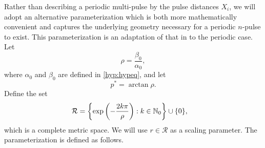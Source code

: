 \documentclass[10pt,reqno]{amsart}
\theoremstyle{plain}
\theoremstyle{definition}
\theoremstyle{remark}
\numberwithin{theorem}{section}
\numberwithin{equation}{section}
\begin{document}
Rather than describing a periodic multi-pulse by the pulse distances $X_i$, we will adopt an alternative parameterization which is both more mathematically convenient and captures the underlying geometry necessary for a periodic $n$-pulse to exist. This parameterization is an adaptation of that in \cite{SandstedeStrut,Sandstede1998} to the periodic case. Let
\begin{equation}\label{defrho}
\rho = \frac{\beta_0}{\alpha_0},
\end{equation}
where $\alpha_0$ and $\beta_0$ are defined in \cref{hyp:hypeq}, and let
\begin{equation}\label{pstar}
p^* = \arctan \rho.
\end{equation}
Define the set
\begin{align}
\mathcal{R} &= \left\{ \mathop\mathrm{exp}\nolimits\left(-\frac{2 k \pi}{\rho}\right) : k \in \mathbb{N}_0 \right\} \cup \{ 0 \},
\end{align}
which is a complete metric space. We will use $r \in \mathcal{R}$ as a scaling parameter. The parameterization is defined as follows.
\end{document}
